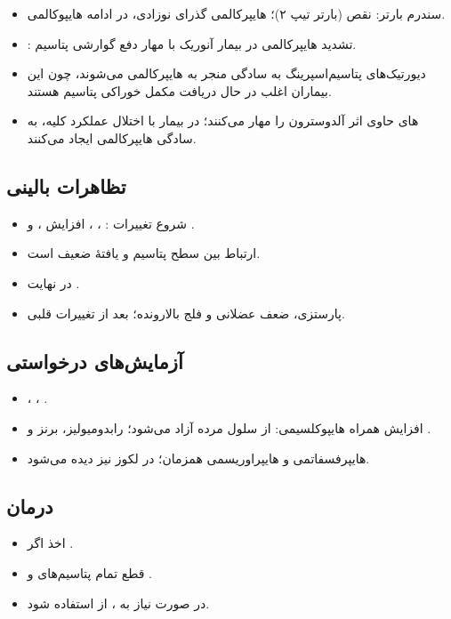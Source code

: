 \documentclass[11pt,a4paper]{article}
\begin{document}
\begin{itemize}
\item سندرم بارتر: نقص  (بارتر تیپ ۲)؛ هایپرکالمی گذرای نوزادی، در ادامه هایپوکالمی.
\item {}: تشدید هایپرکالمی در بیمار آنوریک با مهار دفع گوارشی پتاسیم.
\item دیورتیک‌های پتاسیم‌اسپرینگ به سادگی منجر به هایپرکالمی می‌شوند، چون این بیماران اغلب در حال دریافت مکمل خوراکی پتاسیم هستند.
\item {}های حاوی  اثر آلدوسترون را مهار می‌کنند؛ در بیمار با اختلال عملکرد کلیه، به سادگی هایپرکالمی ایجاد می‌کنند.
\end{itemize}
\subsection*{تظاهرات بالینی}
\begin{itemize}
\item شروع تغییرات : ، ، افزایش ،  و .
\item ارتباط بین سطح پتاسیم و یافتهٔ  ضعیف است.
\item در نهایت .
\item پارستزی، ضعف عضلانی و فلج بالارونده؛ بعد از تغییرات قلبی.
\end{itemize}
\subsection*{آزمایش‌های درخواستی}
\begin{itemize}
\item {}، ، .
\item افزایش  همراه هایپوکلسیمی:  از سلول مرده آزاد می‌شود؛ رابدومیولیز، برنز و .
\item هایپرفسفاتمی و هایپراوریسمی همزمان؛ در لکوز نیز دیده می‌شود.
\end{itemize}
\subsection*{درمان}
\begin{itemize}
\item اخذ  اگر .
\item قطع تمام پتاسیم‌های  و .
\item در صورت نیاز به ، از  استفاده شود.
\end{itemize}
\end{document}
